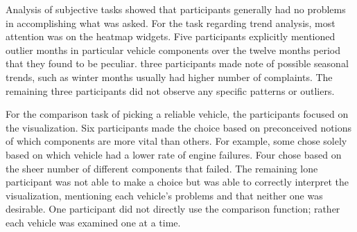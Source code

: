 Analysis of subjective tasks showed that participants generally had no problems
in accomplishing what was asked. For the task regarding trend analysis, most
attention was on the heatmap widgets. Five participants explicitly mentioned
outlier months in particular vehicle components over the twelve months period
that they found to be peculiar. three participants made note of possible seasonal trends,
such as winter months usually had higher number of complaints. The remaining three 
participants did not observe any specific patterns or outliers. 

For the comparison task of picking a reliable vehicle, the participants
focused on the \threed visualization. Six participants made the choice based on
preconceived notions of which components are more vital than others. For example,
some chose solely based on which vehicle had a lower rate of engine failures. Four
chose based on the sheer number of different components that failed. The
remaining lone participant was not able to make a choice but was able to
correctly interpret the visualization, mentioning each vehicle's problems
and that neither one was desirable. One participant did not directly use the
comparison function; rather each vehicle was examined one at a time.


 
%   
%    

